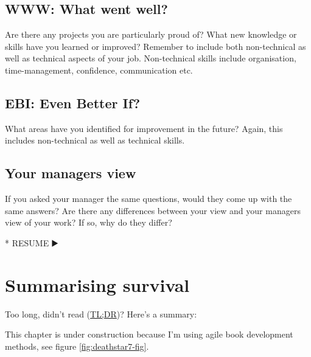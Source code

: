\documentclass[
]{book}
\newenvironment{Shaded}{\begin{snugshade}}{\end{snugshade}}
\newcommand{\NormalTok}[1]{#1}
\newcommand{\SpecialStringTok}[1]{\textcolor[rgb]{0.31,0.60,0.02}{#1}}
\begin{document}
\hypertarget{www-what-went-well}{%
\subsection{WWW: What went well?}\label{www-what-went-well}}

Are there any projects you are particularly proud of? What new knowledge or skills have you learned or improved? Remember to include both non-technical as well as technical aspects of your job. Non-technical skills include organisation, time-management, confidence, communication etc.

\hypertarget{ebi-even-better-if}{%
\subsection{EBI: Even Better If?}\label{ebi-even-better-if}}

What areas have you identified for improvement in the future? Again, this includes non-technical as well as technical skills.

\hypertarget{your-managers-view}{%
\subsection{Your managers view}\label{your-managers-view}}

If you asked your manager the same questions, would they come up with the same answers? Are there any differences between your view and your managers view of your work? If so, why do they differ?

\begin{Shaded}
\begin{Highlighting}[]
\SpecialStringTok{* }\NormalTok{RESUME ▶️}
\end{Highlighting}
\end{Shaded}

\hypertarget{tldr10}{%
\section{Summarising survival}\label{tldr10}}

Too long, didn't read (\href{https://en.wiktionary.org/wiki/too_long;_didn\%27t_read}{TL;DR})? Here's a summary:

This chapter is under construction because I'm using agile book development methods, see figure \ref{fig:deathstar7-fig}.
\end{document}
